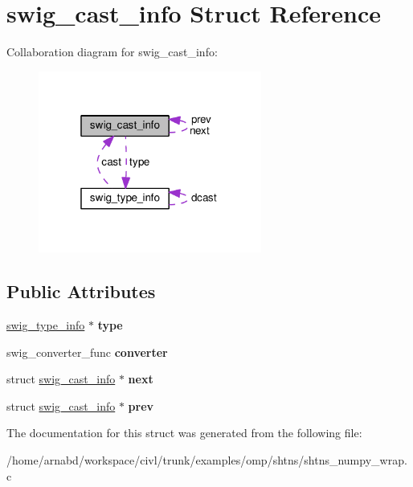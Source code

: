 \hypertarget{structswig__cast__info}{}\section{swig\+\_\+cast\+\_\+info Struct Reference}
\label{structswig__cast__info}


Collaboration diagram for swig\+\_\+cast\+\_\+info\+:
\nopagebreak
\begin{figure}[H]
\begin{center}
\leavevmode
\includegraphics[width=208pt]{structswig__cast__info__coll__graph}
\end{center}
\end{figure}
\subsection*{Public Attributes}
\begin{DoxyCompactItemize}
\item 
\hypertarget{structswig__cast__info_a1c9023a301c8d6806209f4e10df6e9e0}{}\hyperlink{structswig__type__info}{swig\+\_\+type\+\_\+info} $\ast$ {\bfseries type}\label{structswig__cast__info_a1c9023a301c8d6806209f4e10df6e9e0}

\item 
\hypertarget{structswig__cast__info_aa630fddfbb1bf9c97a03f9479ba32f76}{}swig\+\_\+converter\+\_\+func {\bfseries converter}\label{structswig__cast__info_aa630fddfbb1bf9c97a03f9479ba32f76}

\item 
\hypertarget{structswig__cast__info_ae79c6fa058a9d908bbdac14db0c9db5e}{}struct \hyperlink{structswig__cast__info}{swig\+\_\+cast\+\_\+info} $\ast$ {\bfseries next}\label{structswig__cast__info_ae79c6fa058a9d908bbdac14db0c9db5e}

\item 
\hypertarget{structswig__cast__info_afc685bcf38a5a06c6601775138c5999c}{}struct \hyperlink{structswig__cast__info}{swig\+\_\+cast\+\_\+info} $\ast$ {\bfseries prev}\label{structswig__cast__info_afc685bcf38a5a06c6601775138c5999c}

\end{DoxyCompactItemize}


The documentation for this struct was generated from the following file\+:\begin{DoxyCompactItemize}
\item 
/home/arnabd/workspace/civl/trunk/examples/omp/shtns/shtns\+\_\+numpy\+\_\+wrap.\+c\end{DoxyCompactItemize}
